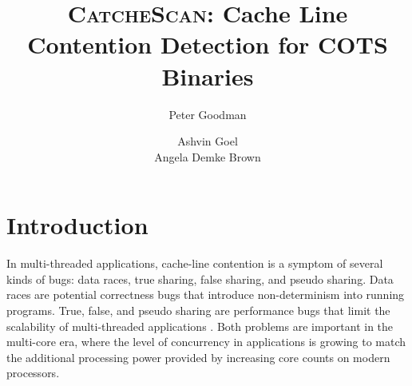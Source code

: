 \documentclass{sig-alternate}
\newcommand{\TextToolname}{CatcheScan}
\newcommand{\Toolname}{\textsc{\TextToolname{}}}
\begin{document}
\title{\Large \bf \Toolname: Cache Line Contention Detection for COTS Binaries}
\author{
\alignauthor
Peter Goodman\\
\and
\alignauthor
Ashvin Goel\\
\alignauthor
Angela Demke Brown\\
}
\maketitle


\section{Introduction}\label{sec:intro}

In multi-threaded applications, cache-line contention is a symptom of several kinds of bugs: data races, true sharing,
false sharing, and pseudo sharing. Data races are potential correctness bugs that introduce non-determinism into running
programs. True, false, and pseudo sharing are performance bugs that limit the scalability of multi-threaded applications
\cite{ImpactOfFalseSharing}. Both problems are important in the multi-core era, where the level of concurrency in
applications is growing to match the additional processing power provided by increasing core counts on modern processors.

\end{document}
